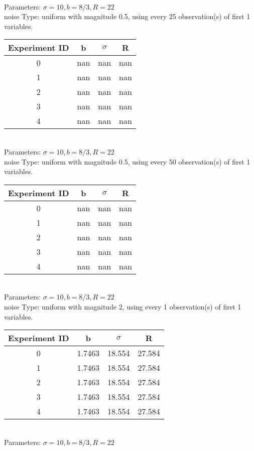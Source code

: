 \begin{multicols}{3}
\begin{tabular}{cccc}
 \end{tabular}\\
Parameters: $\sigma=10, b=8/3, R=22$\\
noise Type: uniform with magnitude 0.5, using every 25 observation(s) of first 1 variables.\\
\begin{tabular}{cccc}
\hline Experiment ID & b & $\sigma$ & R \\ \hline 
0 & nan & nan & nan\\ \hline 
 1 & nan & nan & nan\\ \hline 
 2 & nan & nan & nan\\ \hline 
 3 & nan & nan & nan\\ \hline 
 4 & nan & nan & nan\\ \hline 
 \end{tabular}\\
Parameters: $\sigma=10, b=8/3, R=22$\\
noise Type: uniform with magnitude 0.5, using every 50 observation(s) of first 1 variables.\\
\begin{tabular}{cccc}
\hline Experiment ID & b & $\sigma$ & R \\ \hline 
0 & nan & nan & nan\\ \hline 
 1 & nan & nan & nan\\ \hline 
 2 & nan & nan & nan\\ \hline 
 3 & nan & nan & nan\\ \hline 
 4 & nan & nan & nan\\ \hline 
 \end{tabular}\\
Parameters: $\sigma=10, b=8/3, R=22$\\
noise Type: uniform with magnitude 2, using every 1 observation(s) of first 1 variables.\\
\begin{tabular}{cccc}
\hline Experiment ID & b & $\sigma$ & R \\ \hline 
0 & 1.7463 & 18.554 & 27.584\\ \hline 
 1 & 1.7463 & 18.554 & 27.584\\ \hline 
 2 & 1.7463 & 18.554 & 27.584\\ \hline 
 3 & 1.7463 & 18.554 & 27.584\\ \hline 
 4 & 1.7463 & 18.554 & 27.584\\ \hline 
 \end{tabular}\\
Parameters: $\sigma=10, b=8/3, R=22$\\

\end{multicols}
